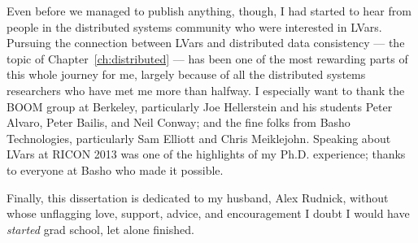 Even before we managed to publish anything, though, I had started to hear from people in the distributed systems community who were interested in LVars.  Pursuing the connection between LVars and distributed data consistency --- the topic of Chapter~\ref{ch:distributed} --- has been one of the most rewarding parts of this whole journey for me, largely because of all the distributed systems researchers who have met me more than halfway.  I especially want to thank the BOOM group at Berkeley, particularly Joe Hellerstein and his students Peter Alvaro, Peter Bailis, and Neil Conway; and the fine folks from Basho Technologies, particularly Sam Elliott and Chris Meiklejohn.  Speaking about LVars at RICON 2013 was one of the highlights of my Ph.D. experience; thanks to everyone at Basho who made it possible.


Finally, this dissertation is dedicated to my husband, Alex Rudnick, without whose unflagging love, support, advice, and encouragement I doubt I would have \emph{started} grad school, let alone finished.
